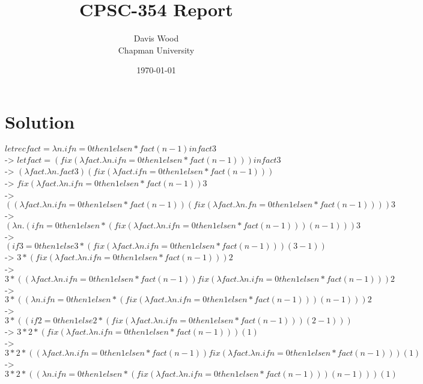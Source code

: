 \documentclass{article}
\title{CPSC-354 Report}
\author{Davis Wood  \\ Chapman University}
\date{\today}
\theoremstyle{theorem}
\theoremstyle{definition}
\theoremstyle{remark}
\begin{document}
\maketitle

\begin{abstract}
\end{abstract}

\setcounter{tocdepth}{3}
\tableofcontents

\section{Solution}\label{intro}
$let rec fact = \lambda n. if n=0 then 1 else n * fact (n-1) in fact 3$ \\
-> $let fact = (fix(\lambda fact.\lambda n.if n=0 then 1 else n * fact (n-1))) in fact 3$ \\
-> $(\lambda fact.\lambda n.fact 3) (fix(\lambda fact.if n=0 then 1 else n * fact (n-1)))$ \\
-> $fix(\lambda fact.\lambda n.if n=0 then 1 else n * fact (n-1)) 3$ \\
-> $((\lambda fact.\lambda n.if n=0 then 1 else n * fact (n-1)) (fix(\lambda fact.\lambda n.f n=0 then 1 else n * fact (n-1)))) 3$ \\
-> $(\lambda n.(if n=0 then 1 else n * (fix(\lambda fact.\lambda n.if n=0 then 1 else n * fact (n-1))) (n-1))) 3$ \\
-> $(if 3=0 then 1 else 3 * (fix(\lambda fact.\lambda n.if n=0 then 1 else n * fact (n-1))) (3-1))$ \\
-> $3 * (fix(\lambda fact.\lambda n.if n=0 then 1 else n * fact (n-1))) 2$ \\
-> $3 * ((\lambda fact.\lambda n.if n=0 then 1 else n * fact (n-1)) fix(\lambda fact.\lambda n.if n=0 then 1 else n * fact (n-1))) 2$ \\
-> $3 * ((\lambda n.if n=0 then 1 else n * (fix(\lambda fact.\lambda n.if n=0 then 1 else n * fact (n-1))) (n-1))) 2$ \\
-> $3 * ((if 2=0 then 1 else 2 * (fix(\lambda fact.\lambda n.if n=0 then 1 else n * fact (n-1))) (2-1)))$ \\
-> $3 * 2 * (fix(\lambda fact.\lambda n.if n=0 then 1 else n * fact (n-1))) (1)$ \\
-> $3 * 2 * ((\lambda fact.\lambda n.if n=0 then 1 else n * fact (n-1)) fix(\lambda fact.\lambda n.if n=0 then 1 else n * fact (n-1))) (1)$ \\
-> $3 * 2 * ((\lambda n.if n=0 then 1 else n * (fix(\lambda fact.\lambda n.if n=0 then 1 else n * fact (n-1))) (n-1))) (1)$ \\
\end{document}
